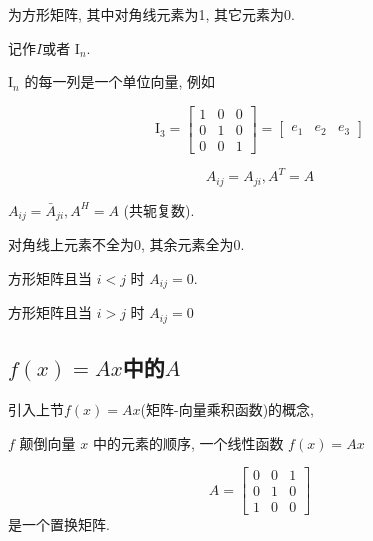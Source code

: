 \begin{definition}[单位矩阵]
    为方形矩阵, 其中对角线元素为1, 其它元素为0.

    记作$I$或者 $ \mathrm{I}_{n} $.
\end{definition}

\begin{corollary}
  $ \mathrm{I}_{n} $ 的每一列是一个单位向量, 例如

$$
\mathrm{I}_{3}=\left[\begin{array}{lll}
1 & 0 & 0 \\
0 & 1 & 0 \\
0 & 0 & 1
\end{array}\right]=\left[\begin{array}{lll}
e_{1} & e_{2} & e_{3}
\end{array}\right]
$$
\end{corollary}

\begin{definition}
    $$ A_{i j}=A_{j i}, A^T =A $$
\end{definition}

\begin{definition}
    $ A_{i j}=\bar{A}_{j i}, A^H = A $ (共轭复数).
\end{definition}

\begin{definition}
    对角线上元素不全为0, 其余元素全为0.
\end{definition}

\begin{definition}[下三角矩阵]
    方形矩阵且当 $ i<j $ 时 $ A_{i j}=0 $.
\end{definition}

\begin{definition}[上三角矩阵]
    方形矩阵且当 $ i>j $ 时 $ A_{i j}=0 $
\end{definition}

\subsection{$f(x)=A x$中的$A$}

引入上节$f(x)=A x$(矩阵-向量乘积函数)的概念,

\begin{example}
    $ f $ 颠倒向量 $ x $ 中的元素的顺序, 一个线性函数 $ f(x)=A x $

    $$ A=\left[\begin{array}{lll}0 & 0 & 1 \\ 0 & 1 & 0 \\ 1 & 0 & 0\end{array}\right] $$是一个置换矩阵.
\end{example}

